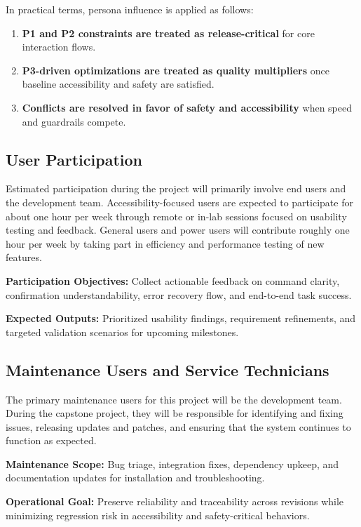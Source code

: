 \documentclass[12pt]{article}
\begin{document}
In practical terms, persona influence is applied as follows:
\begin{enumerate}
  \item \textbf{P1 and P2 constraints are treated as release-critical}
  for core interaction flows.
  \item \textbf{P3-driven optimizations are treated as quality
  multipliers} once baseline accessibility and safety are satisfied.
  \item \textbf{Conflicts are resolved in favor of safety and
  accessibility} when speed and guardrails compete.
\end{enumerate}

\subsection{User Participation}
Estimated participation during the project will primarily involve end
users and the development team. Accessibility-focused users are
expected to participate for about one hour per week through remote or
in-lab sessions focused on usability testing and feedback. General
users and power users will contribute roughly one hour per week by
taking part in efficiency and performance testing of new features.

\textbf{Participation Objectives:}
Collect actionable feedback on command clarity, confirmation
understandability, error recovery flow, and end-to-end task success.

\textbf{Expected Outputs:}
Prioritized usability findings, requirement refinements, and targeted
validation scenarios for upcoming milestones.

\subsection{Maintenance Users and Service Technicians}
The primary maintenance users for this project will be the development
team. During the capstone project, they will be responsible for
identifying and fixing issues, releasing updates and patches, and
ensuring that the system continues to function as expected.

\textbf{Maintenance Scope:}
Bug triage, integration fixes, dependency upkeep, and documentation
updates for installation and troubleshooting.

\textbf{Operational Goal:}
Preserve reliability and traceability across revisions while minimizing
regression risk in accessibility and safety-critical behaviors.
\end{document}
